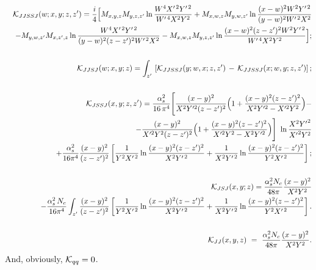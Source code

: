 \documentclass[11pt,a4paper]{article}
\begin{document}
\begin{eqnarray}\label{k1}
&& {\cal K}_{JJSSJ}(w;x,y;z,z^\prime)
 =\frac{i}{ 4}\Big[ M_{x,y,z}M_{y,z,z^\prime}\ln\frac{W^4X^{\prime\,2}Y^{\prime\,2}}{W^{\prime\,4}X^2Y^2}
 +M_{x,w,z}M_{y,w,z^\prime} \ln\frac{(x-w)^2 W^2Y^{\prime\,2}}{(y-w)^2W^{\prime\,2}X^2} \nonumber \\
&& - M_{y,w,z^\prime} M_{x,z^\prime,z}\ln\frac{ W^4 X^{\prime\,2}Y^{\prime\,2}}{(y-w)^2 (z-z^\prime)^2W^{\prime\,2}X^2}
 -M_{x,w,z}M_{y,z,z^\prime}  \ln\frac{ (x-w)^2 (z-z^\prime)^2 W^2 Y^{\prime\,2}}{W^{\prime\,4}X^2Y^2}
    \Big]; \nonumber\\ \nonumber \\
 && {\cal K}_{JJSJ}(w;x,y;z)=  \int_{z^\prime}\, \left[{\cal K}_{JJSSJ}(y;w,x;z,z^\prime)\,-\,{\cal K}_{JJSSJ}(x;w,y;z,z^\prime)\right];
\nonumber \\ \nonumber \\
  && {\cal K}_{JSSJ}(x,y;z,z^\prime)= \frac{\alpha_s^2}{16\,\pi^4}
\Bigg[\frac{(x-y)^2}{ X^2Y'^2(z-z^\prime)^2}\Big(1+\frac{(x-y)^2(z-z')^2}{X^2Y'^2-X'^2Y^2}\Big)-\nonumber \\
&&~~~~~~~~~~~~~~~~~~~~~~~~~~~~~~-\frac{(x-y)^2}{ X'^2Y^2(z-z^\prime)^2}\Big(1+\frac{(x-y)^2(z-z')^2}{X'^2Y^2-X^2Y'^2}\Big)\Bigg]\ \ln\frac{X^2{Y'}^2}{ {X'}^2Y^2}\nonumber \\
  &&+ \frac{\alpha_s^2}{16\pi^4}\frac{(x-y)^2}{(z-z^\prime)^2}
  \left[ \frac{1}{Y^2X^{\prime\,2}} \ln \frac{(x-y)^2(z-z^\prime)^2}{X^2Y^{\prime\,2}} 
  + \frac{1}{X^2Y^{\prime\,2}} \ln \frac{(x-y)^2(z-z^\prime)^2}{Y^2X^{\prime\,2}} \right];
  \nonumber \\ \nonumber \\
  && {\cal K}_{JSJ}(x,y;z)= \frac{\alpha_s^2N_c}{48 \pi}\frac{(x-y)^2}{X^2 Y^2}\nonumber \\ 
  &&- \frac{\alpha_s^2\,N_c}{16\pi^4}\int_{z^\prime} \frac{(x-y)^2}{(z-z^\prime)^2}
  \left[ \frac{1}{Y^2X^{\prime\,2}} \ln \frac{(x-y)^2(z-z^\prime)^2}{X^2Y^{\prime\,2}} 
  + \frac{1}{X^2Y^{\prime\,2}} \ln \frac{(x-y)^2(z-z^\prime)^2}{Y^2X^{\prime\,2}} \right].
  \nonumber  \\ \nonumber \\
&& {\cal K}_{JJ}(x,y,z)\ =\ \frac{\alpha_s^2N_c}{48 \pi}\frac{(x-y)^2}{X^2 Y^2} .
\end{eqnarray}
And, obviously, ${\cal K}_{qq}=0$.
\end{document}
